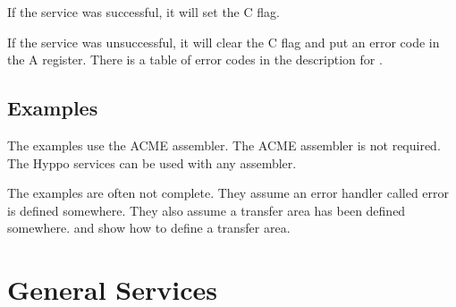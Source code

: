 If the service was successful, it will set the C flag.

If the service was unsuccessful, it will clear the C flag and put an error code
in the A register. There is a table of error codes in the description for
.

\subsection{Examples}
The examples use the ACME assembler. The ACME assembler is not required. The
Hyppo services can be used with any assembler.

The examples are often not complete. They assume an error handler called error
is defined somewhere. They also assume a transfer area has been defined
somewhere.  and 
show how to define a transfer area.


\newpage
\section{General Services}



